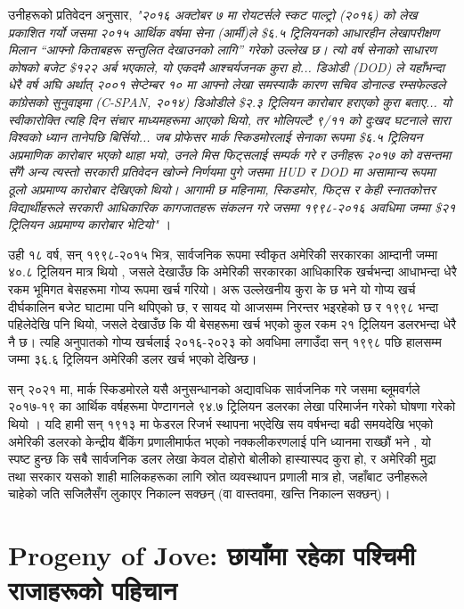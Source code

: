 \documentclass[10pt,twocolumn,letterpaper]{article}
\begin{document}
उनीहरूको प्रतिवेदन अनुसार, \textit{"२०१६ अक्टोबर ७ मा रोयटर्सले स्कट पाल्ट्रो (२०१६) को लेख प्रकाशित गर्यो जसमा २०१५ आर्थिक वर्षमा सेना (आर्मी)ले \$६.५ ट्रिलियनको आधारहीन लेखापरीक्षण मिलान “आफ्नो किताबहरू सन्तुलित देखाउनको लागि” गरेको उल्लेख छ। त्यो वर्ष सेनाको साधारण कोषको बजेट \$१२२ अर्ब भएकाले, यो एकदमै आश्चर्यजनक कुरा हो... डिओडी (DOD) ले यहाँभन्दा धेरै वर्ष अघि अर्थात् २००१ सेप्टेम्बर १० मा आफ्नो लेखा समस्याकै कारण सचिव डोनाल्ड रम्सफेल्डले कांग्रेसको सुनुवाइमा (C-SPAN, २०१४) डिओडीले \$२.३ ट्रिलियन कारोबार हराएको कुरा बताए... यो स्वीकारोक्ति त्यहि दिन संचार माध्यमहरूमा आएको थियो, तर भोलिपल्टै ९/११ को दुःखद घटनाले सारा विश्वको ध्यान तानेपछि बिर्सियो... जब प्रोफेसर मार्क स्किडमोरलाई सेनाका रूपमा \$६.५ ट्रिलियन अप्रमाणिक कारोबार भएको थाहा भयो, उनले मिस फिट्सलाई सम्पर्क गरे र उनीहरू २०१७ को वसन्तमा सँगै अन्य त्यस्तो सरकारी प्रतिवेदन खोज्ने निर्णयमा पुगे जसमा HUD र DOD मा असामान्य रूपमा ठूलो अप्रमाण्य कारोबार देखिएको थियो। आगामी छ महिनामा, स्किडमोर, फिट्स र केही स्नातकोत्तर विद्यार्थीहरूले सरकारी आधिकारिक कागजातहरू संकलन गरे जसमा १९९८-२०१६ अवधिमा जम्मा \$२१ ट्रिलियन अप्रमाण्य कारोबार भेटियो"} \cite{12}।

उही १८ वर्ष, सन् १९९८-२०१५ भित्र, सार्वजनिक रूपमा स्वीकृत अमेरिकी सरकारका आम्दानी जम्मा ४०.८ ट्रिलियन मात्र थियो \cite{15}, जसले देखाउँछ कि अमेरिकी सरकारका आधिकारिक खर्चभन्दा आधाभन्दा धेरै रकम भूमिगत बेसहरूमा गोप्य रूपमा खर्च गरियो। अरू उल्लेखनीय कुरा के छ भने यो गोप्य खर्च दीर्घकालिन बजेट घाटामा पनि थपिएको छ, र सायद यो आजसम्म निरन्तर भइरहेको छ र १९९८ भन्दा पहिलेदेखि पनि थियो, जसले देखाउँछ कि यी बेसहरूमा खर्च भएको कुल रकम २१ ट्रिलियन डलरभन्दा धेरै नै छ। त्यहि अनुपातको गोप्य खर्चलाई २०१६-२०२३ को अवधिमा लगाउँदा सन् १९९८ पछि हालसम्म जम्मा ३६.६ ट्रिलियन अमेरिकी डलर खर्च भएको देखिन्छ।

सन् २०२१ मा, मार्क स्किडमोरले यसै अनुसन्धानको अद्यावधिक सार्वजनिक गरे जसमा ब्लूमवर्गले २०१७-१९ का आर्थिक वर्षहरूमा पेण्टागनले ९४.७ ट्रिलियन डलरका लेखा परिमार्जन गरेको घोषणा गरेको थियो \cite{17,18}। यदि हामी सन् १९१३ मा फेडरल रिजर्भ स्थापना भएदेखि सय वर्षभन्दा बढी समयदेखि भएको अमेरिकी डलरको केन्द्रीय बैंकिंग प्रणालीमार्फत भएको नक्कलीकरणलाई पनि ध्यानमा राख्छौं भने \cite{37}, यो स्पष्ट हुन्छ कि सबै सार्वजनिक डलर लेखा केवल दोहोरो बोलीको हास्यास्पद कुरा हो, र अमेरिकी मुद्रा तथा सरकार यसको शाही मालिकहरूका लागि स्रोत व्यवस्थापन प्रणाली मात्र हो, जहाँबाट उनीहरूले चाहेको जति सजिलैसँग लुकाएर निकाल्न सक्छन् (वा वास्तवमा, खन्ति निकाल्न सक्छन्)।
\section{Progeny of Jove: छायाँमा रहेका पश्चिमी राजाहरूको पहिचान}
\end{document}
